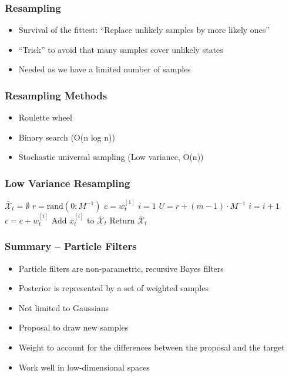 \begin{frame}
    \frametitle{Resampling}
    \begin{itemize}
        \item Survival of the fittest: “Replace unlikely samples by more likely ones”
        \item “Trick” to avoid that many samples cover unlikely states
        \item Needed as we have a limited number of samples
    \end{itemize}
\end{frame}
    
\begin{frame}
    \frametitle{Resampling Methods}
    \begin{itemize}
        \item Roulette wheel
        \item Binary search (O(n log n))
        \item Stochastic universal sampling (Low variance, O(n))
    \end{itemize}
\end{frame}
    
\begin{frame}
    \frametitle{Low Variance Resampling}
    \begin{algorithmic}[1]
    \State $\bar{\mathcal{X}}_t = \emptyset$
    \State $r = \text{rand}(0; M^{-1})$
    \State $c = w_t^{[1]}$
    \State $i = 1$
        \State $U = r + (m - 1) \cdot M^{-1}$
            \State $i = i + 1$
            \State $c = c + w_t^{[i]}$
        \EndWhile
        \State Add $x_t^{[i]}$ to $\bar{\mathcal{X}}_t$
    \EndFor
    \State Return $\bar{\mathcal{X}}_t$
    \end{algorithmic}
\end{frame}
    
\begin{frame}
    \frametitle{Summary – Particle Filters}
    \begin{itemize}
        \item Particle filters are non-parametric, recursive Bayes filters
        \item Posterior is represented by a set of weighted samples
        \item Not limited to Gaussians
        \item Proposal to draw new samples
        \item Weight to account for the differences between the proposal and the target
        \item Work well in low-dimensional spaces
    \end{itemize}
\end{frame}
    
